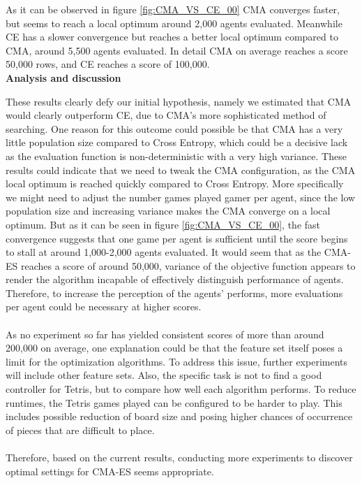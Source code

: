 As it can be observed in figure \ref{fig:CMA_VS_CE_00} CMA converges faster,
but seems to reach a local optimum around 2,000 agents evaluated. Meanwhile CE has a 
slower convergence but reaches a better local optimum compared to CMA, around 5,500
agents evaluated. In detail CMA on average reaches a score 50,000 rows, and
CE reaches a score of 100,000.\\

\textbf{Analysis and discussion}

These results clearly defy our initial hypothesis, namely we estimated that
CMA would clearly outperform CE, due to CMA's more sophisticated method of 
searching. One reason for this outcome could possible be that
CMA has a very little population size compared to Cross Entropy,
which could be a decisive lack as the evaluation function is non-deterministic with 
a very high variance. These results could indicate that we need to tweak the CMA
configuration, as the CMA local optimum is reached quickly compared to Cross Entropy.
More specifically we might need to adjust the number games played gamer per agent,
since the low population size and increasing variance makes the CMA converge on a
local optimum. But as it can be seen in figure \ref{fig:CMA_VS_CE_00}, the
fast convergence suggests that one game per agent is sufficient until the
score begins to stall at around 1,000-2,000 agents evaluated. It would seem that 
as the CMA-ES reaches a score of around 50,000, variance of the objective function 
appears to render the algorithm incapable of effectively distinguish performance 
of agents. Therefore, to increase the perception of the agents’ performs, 
more evaluations per agent could be necessary at higher scores.\\
\\
As no experiment so far has yielded consistent scores of more than around 200,000 
on average, one explanation could be that the feature set itself poses a limit for 
the optimization algorithms. To address this issue, further experiments will include 
other feature sets. Also, the specific task is not to find a good controller for Tetris, 
but to compare how well each algorithm performs. To reduce runtimes, the Tetris games 
played can be configured to be harder to play. This includes possible reduction of 
board size and posing higher chances of occurrence of pieces that are difficult to place.\\
\\
Therefore, based on the current results, conducting more experiments to discover optimal
settings for CMA-ES seems appropriate.

